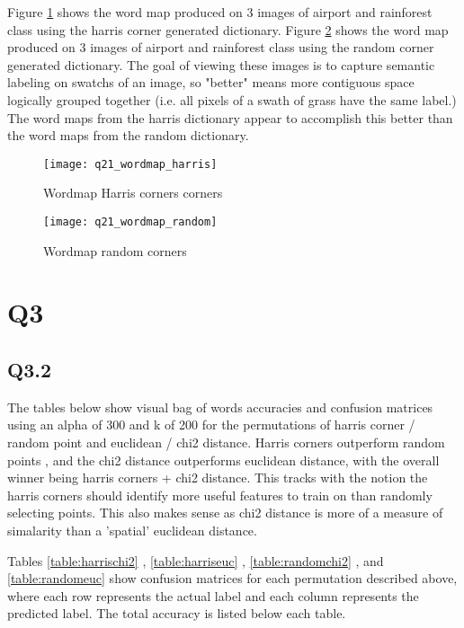 \documentclass[12pt]{article}
\begin{document}
Figure \ref{fig:wordmapharris} shows the word map produced on 3 images of airport and rainforest class using the harris corner generated dictionary.
Figure \ref{fig:wordmaprandom} shows the word map produced on 3 images of airport and rainforest class using the random corner generated dictionary.
The goal of viewing these images is to capture semantic labeling on swatchs of an image, so "better" means more contiguous space logically grouped together (i.e. all pixels of a swath of grass have the same label.) The word maps from the harris dictionary appear to accomplish this better than the word maps from the random dictionary.

\begin{figure}[H]
\centering
\texttt{[image: q21\_wordmap\_harris]}
\caption{Wordmap Harris corners corners}    
\label{fig:wordmapharris}
\end{figure}   


\begin{figure}[H]
\centering
\texttt{[image: q21\_wordmap\_random]}
\caption{Wordmap random corners}    
\label{fig:wordmaprandom}
\end{figure}   

\newpage
\section{Q3}
\subsection{Q3.2}

The tables below show visual bag of words accuracies and confusion matrices using an alpha of 300 and k of 200 for the permutations of harris corner / random point and euclidean / chi2 distance.  Harris corners outperform random points , and the chi2 distance outperforms euclidean distance, with the overall winner being harris corners + chi2 distance. This tracks with the notion the harris corners should identify more useful features to train on than randomly selecting points. This also makes sense as chi2 distance is more of a measure of simalarity than a 'spatial' euclidean distance.

Tables \ref{table:harrischi2} , \ref{table:harriseuc} , \ref{table:randomchi2} , and \ref{table:randomeuc} show confusion matrices for each permutation described above, where each row represents the actual label and each column represents the predicted label. The total accuracy is listed below each table.
\end{document}
